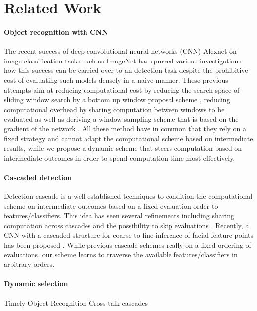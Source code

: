 \section{Related Work}\label{sec:related}

\paragraph{Object recognition with CNN}\label{object-recognition-with-cnn}
The recent success of deep convolutional neural networks (CNN) Alexnet \cite{Krizhevsky-NIPS-2012} on image classification tasks such as ImageNet \cite{deng2009cvpr} has spurred various investigations \cite{Girshick-CVPR-2014,Zou-CVPR-2014,Simonyan-ICLR-2014,Sermanet-ICLR-2014} how this success can be carried over to an detection task despite the prohibitive cost of evaluating such models densely in a naive manner. These previous attempts aim at reducing computational cost by reducing the search space of sliding window search by a bottom up window proposal scheme \cite{Girshick-CVPR-2014}, reducing computational overhead by sharing computation between windows to be evaluated \cite{Zou-CVPR-2014,Sermanet-ICLR-2014} as well as deriving a window sampling scheme that is based on the gradient of the network \cite{Simonyan-ICLR-2014}. All these method have in common that they rely on a fixed strategy and cannot adapt the computational scheme based on intermediate results, while we propose a dynamic scheme that steers computation based on intermediate outcomes in order to spend computation time most effectively.

\paragraph{Cascaded detection}\label{cascaded-detection}
Detection cascade \cite{Viola2004,Felzenszwalb-CVPR-2010} is a well established techniques to condition the computational scheme on intermediate outcomes based on a fixed evaluation order to features/classifiers. This idea has seen several refinements including sharing computation across cascades \cite{Dollar-ECCV-2012} and the possibility to skip evaluations \cite{benbouzid12icml}. Recently, a CNN with a cascaded structure for coarse to fine inference of facial feature points has been proposed \cite{cnn_cascade}. While previous cascade schemes really on a fixed ordering of evaluations, our scheme learns to traverse the available features/classifiers in arbitrary orders.

\paragraph{Dynamic selection}\label{dynamic-selection}
  Timely Object Recognition \cite{Karayev-NIPS-2012}
  Cross-talk cascades \cite{Dollar-ECCV-2012}

